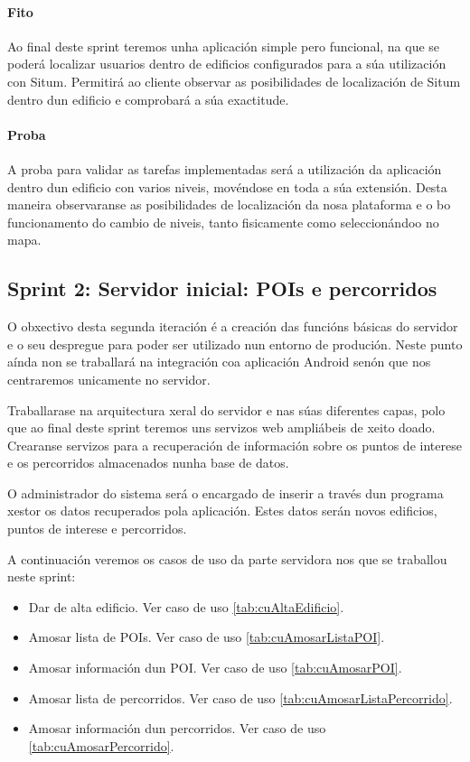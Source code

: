 \paragraph{Fito}
Ao final deste sprint teremos unha aplicación simple pero funcional, na que se poderá localizar usuarios dentro de edificios configurados para a súa utilización con Situm. Permitirá ao cliente observar as posibilidades de localización de Situm dentro dun edificio e comprobará a súa exactitude.

\paragraph{Proba}
A proba para validar as tarefas implementadas será a utilización da aplicación dentro dun edificio con varios niveis, movéndose en toda a súa extensión. Desta maneira observaranse as posibilidades de localización da nosa plataforma e o bo funcionamento do cambio de niveis, tanto fisicamente como seleccionándoo no mapa.


\subsection{Sprint 2: Servidor inicial: POIs e percorridos}
O obxectivo desta segunda iteración é a creación das funcións básicas do servidor e o seu despregue para poder ser utilizado nun entorno de produción. Neste punto aínda non se traballará na integración coa aplicación Android senón que nos centraremos unicamente no servidor.

Traballarase na arquitectura xeral do servidor e nas súas diferentes capas, polo que ao final deste sprint teremos uns servizos web ampliábeis de xeito doado. Crearanse servizos para a recuperación de información sobre os puntos de interese e os percorridos almacenados nunha base de datos.

O administrador do sistema será o encargado de inserir a través dun programa xestor os datos recuperados pola aplicación. Estes datos serán novos edificios, puntos de interese e percorridos.

A continuación veremos os casos de uso da parte servidora nos que se traballou neste sprint:

\begin{itemize}
	\item Dar de alta edificio. Ver caso de uso \ref{tab:cuAltaEdificio}.
	\item Amosar lista de POIs. Ver caso de uso \ref{tab:cuAmosarListaPOI}.
	\item Amosar información dun POI. Ver caso de uso \ref{tab:cuAmosarPOI}.
	\item Amosar lista de percorridos. Ver caso de uso \ref{tab:cuAmosarListaPercorrido}.
	\item Amosar información dun percorridos. Ver caso de uso \ref{tab:cuAmosarPercorrido}.
\end{itemize}

